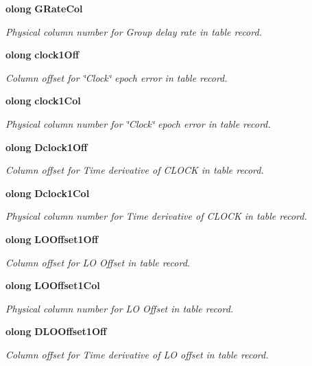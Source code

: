 \begin{CompactItemize}
{\bf olong} {\bf GRate\-Col}
\begin{CompactList}\small\item\em Physical column number for Group delay rate in table record. \item\end{CompactList}\item 
{\bf olong} {\bf clock1Off}
\begin{CompactList}\small\item\em Column offset for \char`\"{}Clock\char`\"{} epoch error in table record. \item\end{CompactList}\item 
{\bf olong} {\bf clock1Col}
\begin{CompactList}\small\item\em Physical column number for \char`\"{}Clock\char`\"{} epoch error in table record. \item\end{CompactList}\item 
{\bf olong} {\bf Dclock1Off}
\begin{CompactList}\small\item\em Column offset for Time derivative of CLOCK in table record. \item\end{CompactList}\item 
{\bf olong} {\bf Dclock1Col}
\begin{CompactList}\small\item\em Physical column number for Time derivative of CLOCK in table record. \item\end{CompactList}\item 
{\bf olong} {\bf LOOffset1Off}
\begin{CompactList}\small\item\em Column offset for LO Offset in table record. \item\end{CompactList}\item 
{\bf olong} {\bf LOOffset1Col}
\begin{CompactList}\small\item\em Physical column number for LO Offset in table record. \item\end{CompactList}\item 
{\bf olong} {\bf DLOOffset1Off}
\begin{CompactList}\small\item\em Column offset for Time derivative of LO offset in table record. \item\end{CompactList}\item 

\end{CompactItemize}
